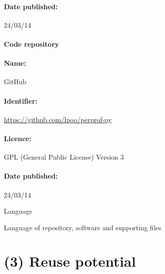 \documentclass[10pt,a4paper]{article}
\begin{document}
\paragraph{Date published:} 24/03/14

\paragraph{Code repository} 


\paragraph{Name:} GitHub

\paragraph{Identifier:} \url{https://github.com/lpoo/perprof-py} 

\paragraph{Licence:} GPL (General Public License) Version 3

\paragraph{Date published:} 24/03/14


Language

Language of repository, software and supporting files


\section*{(3) Reuse potential}

\printbibliography
\end{document}
